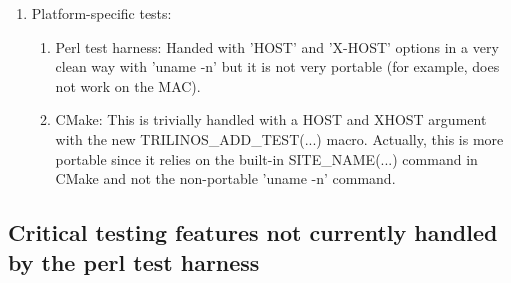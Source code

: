 \documentclass[pdf,ps2pdf,11pt]{SANDreport}
\begin{document}
\begin{enumerate}
\begin{enumerate}
  \end{enumerate}

{}\item Platform-specific tests:

  \begin{enumerate}

  {}\item Perl test harness: Handed with 'HOST' and 'X-HOST' options
  in a very clean way with 'uname -n' but it is not very portable (for
  example, does not work on the MAC).

  {}\item CMake: This is trivially handled with a HOST and XHOST
  argument with the new TRILINOS\_ADD\_TEST(...) macro.  Actually,
  this is more portable since it relies on the built-in
  SITE\_NAME(...) command in CMake and not the non-portable 'uname -n'
  command.

  \end{enumerate}

\end{enumerate}

%
{}\subsection{Critical testing features not currently handled by the perl
test harness}
%
\end{document}
